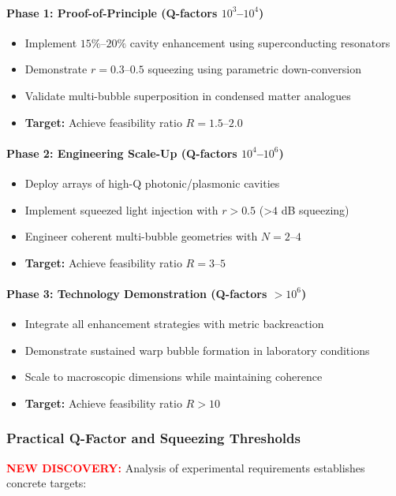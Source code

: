 \documentclass[11pt]{article}
\begin{document}
\paragraph{Phase 1: Proof-of-Principle (Q-factors $10^3$--$10^4$)}
\begin{itemize}
  \item Implement $15\%$--$20\%$ cavity enhancement using superconducting resonators
  \item Demonstrate $r = 0.3$--$0.5$ squeezing using parametric down-conversion
  \item Validate multi-bubble superposition in condensed matter analogues
  \item \textbf{Target:} Achieve feasibility ratio $R = 1.5$--$2.0$
\end{itemize}

\paragraph{Phase 2: Engineering Scale-Up (Q-factors $10^4$--$10^6$)}
\begin{itemize}
  \item Deploy arrays of high-Q photonic/plasmonic cavities
  \item Implement squeezed light injection with $r > 0.5$ (>$4$ dB squeezing)
  \item Engineer coherent multi-bubble geometries with $N = 2$--$4$
  \item \textbf{Target:} Achieve feasibility ratio $R = 3$--$5$
\end{itemize}

\paragraph{Phase 3: Technology Demonstration (Q-factors $> 10^6$)}
\begin{itemize}
  \item Integrate all enhancement strategies with metric backreaction
  \item Demonstrate sustained warp bubble formation in laboratory conditions
  \item Scale to macroscopic dimensions while maintaining coherence
  \item \textbf{Target:} Achieve feasibility ratio $R > 10$
\end{itemize}

\subsubsection*{Practical Q-Factor and Squeezing Thresholds}
\textcolor{red}{\textbf{NEW DISCOVERY:}} Analysis of experimental requirements establishes concrete targets:
\end{document}
